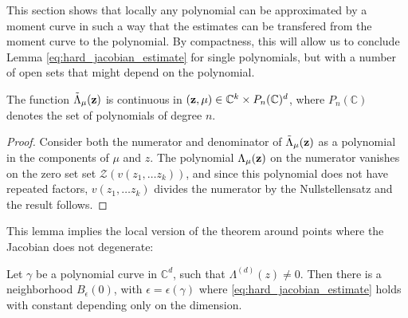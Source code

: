 	This section shows that locally any polynomial can be approximated by a moment curve in such a way that the estimates can be transfered from the moment curve to the polynomial. By compactness, this will allow us to conclude Lemma \eqref{eq:hard_jacobian_estimate} for single polynomials, but with a number of open sets that might depend on the polynomial.

	\begin{lemma}
		\label{lem:nondegenerate_continuity}The function $\tilde\Lambda_{\mu}({\bf z})$ is continuous in $({\bf z},\mu)\in \mathbb C^k \times P_n(\mathbb C)^d$, where $P_n(\mathbb C)$ denotes the set of polynomials of degree $n$.
	\end{lemma}

	\begin{proof}
		Consider both the numerator and denominator of $\tilde \Lambda_\mu({\bf z})$ as a polynomial in the components of $\mu$ and $z$. The polynomial $\Lambda_\mu(\bf z)$ on the numerator vanishes on the zero set set $\mathcal Z(v(z_1, \dots z_k))$, and since this polynomial does not have repeated factors, $v(z_1, \dots z_k)$ divides the numerator by the Nullstellensatz and the result follows. 
	\end{proof}

	This lemma implies the local version of the theorem around points where the Jacobian does not degenerate:

	\begin{prop}
	\label{prop:local_nondegenerate_jacobian}
		Let $\gamma$ be a polynomial curve in $\mathbb C^d$, such that $\Lambda^{(d)}(z) \neq 0$. Then there is a neighborhood $B_\epsilon(0)$, with $\epsilon=\epsilon(\gamma)$ where \eqref{eq:hard_jacobian_estimate} holds with constant depending only on the dimension.
	\end{prop}



